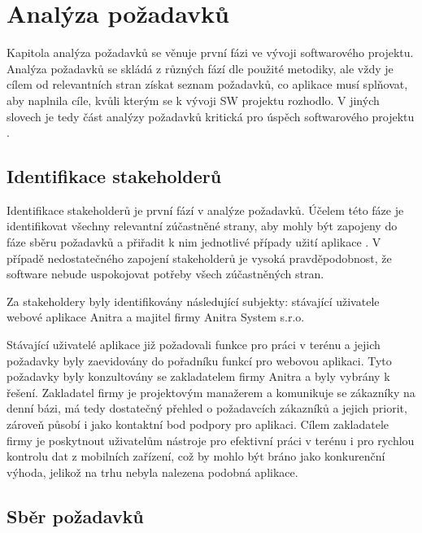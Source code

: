 
\chapter{Analýza požadavků}

Kapitola analýza požadavků se věnuje první fázi ve vývoji softwarového projektu. Analýza požadavků se skládá z různých fází dle použité metodiky, ale vždy je cílem od relevantních stran získat seznam požadavků, co aplikace musí splňovat, aby naplnila cíle, kvůli kterým se k vývoji SW projektu rozhodlo. V jiných slovech je tedy část analýzy požadavků kritická pro úspěch softwarového projektu \cite{maguire2002user}.


\section{Identifikace stakeholderů}


Identifikace stakeholderů je první fází v analýze požadavků. Účelem této fáze je identifikovat všechny relevantní zúčastněné strany, aby mohly být zapojeny do fáze sběru požadavků a přiřadit k nim jednotlivé případy užití aplikace \cite{maguire2002user}. V případě nedostatečného zapojení stakeholderů je vysoká pravděpodobnost, že software nebude uspokojovat potřeby všech zúčastněných stran.

Za stakeholdery byly identifikovány následující subjekty: stávající uživatele webové aplikace Anitra a majitel firmy Anitra System s.r.o.

Stávající uživatelé aplikace již požadovali funkce pro práci v terénu a jejich požadavky byly zaevidovány do pořadníku funkcí pro webovou aplikaci. Tyto požadavky byly konzultovány se zakladatelem firmy Anitra a byly vybrány k řešení. Zakladatel firmy je projektovým manažerem a komunikuje se zákazníky na denní bázi, má tedy dostatečný přehled o požadavcích zákazníků a jejich priorit, zároveň působí i jako kontaktní bod podpory pro aplikaci. Cílem zakladatele firmy je poskytnout uživatelům nástroje pro efektivní práci v terénu i pro rychlou kontrolu dat z mobilních zařízení, což by mohlo být bráno jako konkurenční výhoda, jelikož na trhu nebyla nalezena podobná aplikace.

\section{Sběr požadavků}

